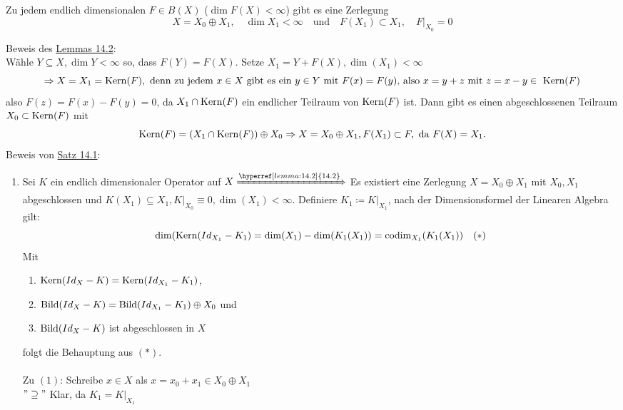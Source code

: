 \begin{lemma} \label{lemma:14.2}
	Zu jedem endlich dimensionalen $F \in B(X)$ ($\dim F(X) < \infty$) gibt es eine Zerlegung
		\[ X = X_{0} \oplus X_{1}, \quad \dim X_{1} < \infty \quad \text{und} \quad F(X_{1}) \subset X_{1}, \quad F|_{X_{0}} = 0 \]
\end{lemma}

\begin{beweis}
	Beweis des \hyperref[lemma:14.2]{Lemmas 14.2}: \\
	Wähle $Y \subseteq X, \dim Y < \infty$ so, dass $F(Y) = F(X)$. Setze $X_{1} = Y + F(X), \dim(X_{1}) < \infty$
		\[ \Rightarrow X = X_{1} = \kernn(F), \text{ denn zu jedem } x \in X \text{ gibt es ein } y \in Y \text{ mit } F(x) = F(y) \text{, also } x = y + z \text{ mit } z = x - y \in \kernn(F) \]
		also $F(z) = F(x) - F(y) = 0$, da $X_{1} \cap \mathop{\rm Kern}\nolimits(F)$ ein endlicher Teilraum von $\mathop{\rm Kern}\nolimits(F)$ ist. Dann gibt es einen abgeschlossenen Teilraum $X_{0} \subset \mathop{\rm Kern}\nolimits(F)$ mit 
		\[ \mathop{\rm Kern}\nolimits(F) = (X_{1} \cap \mathop{\rm Kern}\nolimits(F)) \oplus X_{0} \Rightarrow X = X_{0} \oplus X_{1}, F(X_{1}) \subset F, \text{ da } F(X) = X_{1}. \]
		Beweis von \hyperref[satz:14.1]{Satz 14.1}:
		\begin{enumerate}[label=\alph*\upshape)]
			\item Sei $K$ ein endlich dimensionaler Operator auf $X \xRightarrow[]{\hyperref[lemma:14.2]{14.2}}$ Es existiert eine Zerlegung $X = X_{0} \oplus X_{1}$ mit $X_{0}, X_{1}$ abgeschlossen und $K(X_{1}) \subseteq X_{1}, K|_{X_{0}} \equiv 0, \dim(X_{1}) < \infty$. Definiere $K_{1} \coloneqq K|_{X_{1}}$, nach der Dimensionsformel der Linearen Algebra gilt:
				\[ \dim( \mathop{\rm Kern}\nolimits(Id_{X_{1}} - K_{1}) = \dim(X_{1}) - \dim(K_{1}(X_{1})) = \operatorname{codim}_{X_{1}}(K_{1}(X_{1})) \quad (*) \label{eq:14.1.5-*} \]
				Mit
				\begin{enumerate}[label=(\arabic*\upshape)]
					\item $\mathop{\rm Kern}\nolimits(Id_{X} - K) = \mathop{\rm Kern}\nolimits(Id_{X_{1}} - K_{1})$,
					\item $\mathop{\rm Bild}\nolimits(Id_{X} - K) = \mathop{\rm Bild}\nolimits(Id_{X_{1}} - K_{1}) \oplus X_{0}$ und 
					\item $\mathop{\rm Bild}\nolimits(Id_{X} - K)$ ist abgeschlossen in $X$
				\end{enumerate}
				folgt die Behauptung aus \hyperref[eq:14.1.5-*]{$(*)$}. \\ \\
				Zu $(1)$: Schreibe $x \in X$ als $x = x_{0} + x_{1} \in X_{0} \oplus X_{1}$ \\
				$"\supseteq"$ Klar, da $K_{1} = K|_{X_{1}}$ \\

\end{enumerate}
\end{beweis}
